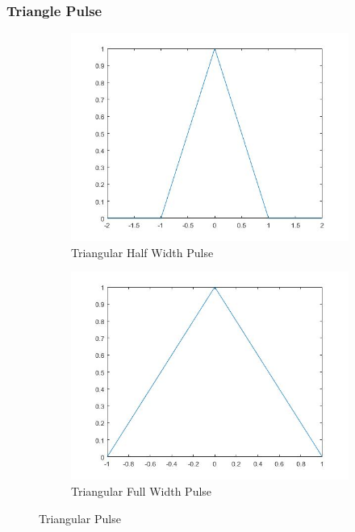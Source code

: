 \documentclass{article}
\begin{document}
\subsubsection{Triangle Pulse}
\begin{figure}[H]
  \begin{center}
    \begin{subfigure}[b]{0.4\linewidth}
      \includegraphics[width = \linewidth]{Tri_Half.jpg}
      \caption{Triangular Half Width Pulse}
    \end{subfigure}
    \begin{subfigure}[b]{0.4\linewidth}
      \includegraphics[width = \linewidth]{Tri_Full.jpg}
      \caption{Triangular Full Width Pulse}
    \end{subfigure}
    \caption{Triangular Pulse}
    \label{fig:Tri}
  \end{center}
\end{figure}
\end{document}
